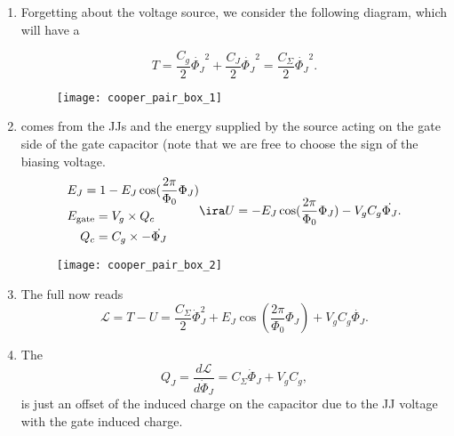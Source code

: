 \begin{enumerate}
\item Forgetting about  the voltage source, we consider  the following diagram, which will  have a 

  \begin{equation}\label{key}
    T = \frac{C_g}{2}\dot{\Phi_J}^2 + \frac{C_J}{2}\dot{\Phi_J}^2 = \frac{C_\Sigma}{2}\dot{\Phi_J}^2.
  \end{equation}

\begin{figure}[h]
  \centering \texttt{[image: cooper\_pair\_box\_1]}
\end{figure}

\noindent

\item \textbf{} comes from the JJs  and the energy supplied by the  source acting on the
  gate side of the gate capacitor (note that we are free to choose the sign of the biasing voltage.
  \begin{equation}\label{key}
    \begin{aligned}
      & E_J = 1 - E_J\cos(\frac{2\pi}{\Phi_0}\Phi_J)\\
      & \begin{aligned}
        E_\text{gate} & = V_g \times Q_c\\
        Q_c & = C_g\times -\dot{\Phi_J}
      \end{aligned}
    \end{aligned}\ira U = -E_J\cos(\frac{2\pi}{\Phi_0}\Phi_J) - V_gC_g\dot{\Phi_J}.
  \end{equation}

\begin{figure}[h]
  \centering \texttt{[image: cooper\_pair\_box\_2]}
\end{figure}

\noindent

\item The full  now reads
  \begin{equation}\label{key}
    \mathcal{L} = T - U = \frac{C_\Sigma}{2}\dot{\Phi}_J^2 + E_J\cos(\frac{2\pi}{\Phi_0}\Phi_J) + V_gC_g\dot{\Phi_J}.
  \end{equation}

\item The \textbf{}
  \begin{equation}\label{key}
    Q_J = \frac{d\mathcal{L}}{d\dot{\Phi}_J} = C_\Sigma\dot{\Phi}_J + V_gC_g,
  \end{equation}
  \noindent is just an offset of the induced charge on the capacitor due to the JJ voltage with the gate induced charge.


\end{enumerate}
